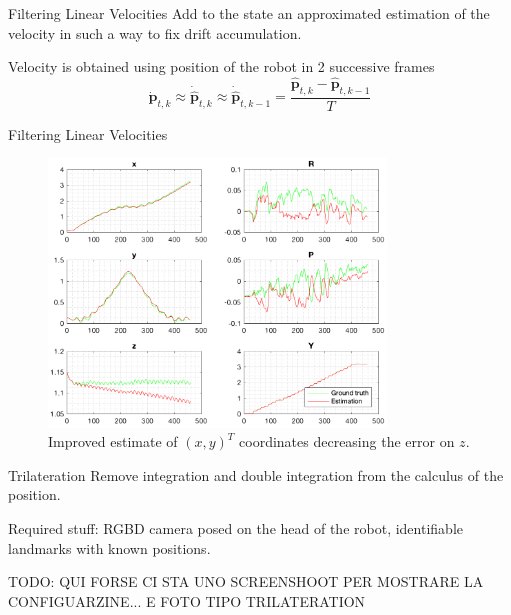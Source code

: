 \documentclass[10pt]{beamer}
\begin{document}
    \begin{frame}[fragile]{Filtering Linear Velocities}
        Add to the state an approximated estimation of the velocity in such a way to fix drift accumulation.

        Velocity is obtained using position of the robot in 2 successive frames
        \begin{equation*}
            \bm{\dot{p}}_{t,k} \approx \bm{\dot{\hat{p}}}_{t,k} \approx \bm{\dot{\hat{p}}}_{t,k-1}
            = \frac{\bm{\hat{p}}_{t,k} - \bm{\hat{p}}_{t,k-1}}{T}
        \end{equation*}
    \end{frame}

    \begin{frame}[fragile]{Filtering Linear Velocities}
        \begin{figure}
        \caption{Improved estimate of $(x, y)^{T}$ coordinates decreasing the error on $z$.}
        \vspace{-0.3cm}
        \includegraphics[width=0.8\textwidth]{images/accelerometer_prev_linearvelocity.png}
    \end{figure}

    \end{frame}

    \begin{frame}[fragile]{Trilateration}
        Remove integration and double integration from the calculus of the position.

        Required stuff: RGBD camera posed on the head of the robot, identifiable landmarks with known positions.

        TODO: QUI FORSE CI STA UNO SCREENSHOOT PER MOSTRARE LA CONFIGUARZINE... E FOTO TIPO TRILATERATION
    \end{frame}
\end{document}
